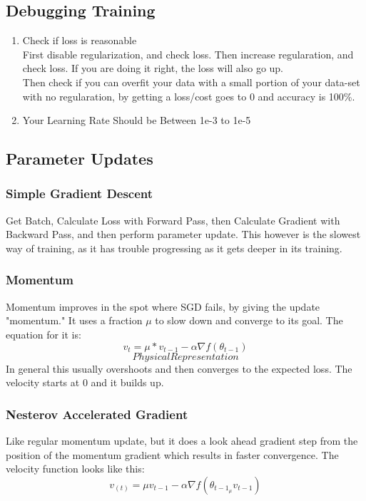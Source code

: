 \documentclass[11pt]{article}
\begin{document}
\begin{enumerate}
\subsection{Debugging Training}
\label{sec-2-7}
\begin{enumerate}
\item Check if loss is reasonable \\
\label{sec-2-7-0-1}
First disable regularization, and check loss. Then increase regularation, and check loss. If you are doing it right, the loss will
also go up. \\ Then check if you can overfit your data with a small portion of your data-set with no regularation, by getting
a loss/cost goes to 0 and accuracy is 100\%.
\item Your Learning Rate Should be Between 1e-3 to 1e-5
\label{sec-2-7-0-2}
\end{enumerate}
\subsection{Parameter Updates}
\label{sec-2-8}
\subsubsection{Simple Gradient Descent}
\label{sec-2-8-1}
Get Batch, Calculate Loss with Forward Pass, then Calculate Gradient with Backward Pass, and then perform parameter update. 
This however is the slowest way of training, as it has trouble progressing as it gets deeper in its training.
\subsubsection{Momentum}
\label{sec-2-8-2}
Momentum improves in the spot where SGD fails, by giving the update "momentum." It uses a fraction $\mu$ to slow down and converge to its goal.
The equation for it is: $$v_t = \mu * v_{t-1} - \alpha \nabla f(\theta_{t-1})$$
$$Physical Representation$$
In general this usually overshoots and then converges to the expected loss. The velocity starts at 0 and it builds up.
\subsubsection{Nesterov Accelerated Gradient}
\label{sec-2-8-3}
Like regular momentum update, but it does a look ahead gradient step from the position of the momentum gradient
which results in faster convergence. The velocity function looks like this: $$v_(t) = \mu  v_{t-1} - \alpha \nabla f(\theta_{t-1} _ \mu v_{t-1})$$

\end{enumerate}
\end{document}
